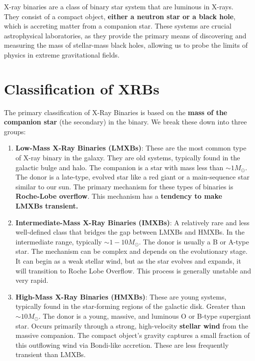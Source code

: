 X-ray binaries are a class of binary star system that are luminous in X-rays. 
They consist of a compact object, \textbf{either a neutron star or a black hole}, which is accreting matter from a companion star. These systems are crucial astrophysical laboratories, as they provide the primary means of discovering and measuring the mass of stellar-mass black holes, allowing us to probe the limits of physics in extreme gravitational fields.

\section{Classification of XRBs}

The primary classification of X-Ray Binaries is based on the \textbf{mass of the companion star} (the secondary) in the binary. We break these down into three groups:
\par
\vspace{10pt}
\begin{enumerate}
    \item \textbf{Low-Mass X-Ray Binaries (LMXBs)}: These are the most common type of X-ray binary in the galaxy. They are old systems, typically found in the galactic bulge and halo. The companion is a star with mass less than $\sim 1 M_{\odot}$. The donor is a late-type, evolved star like a red giant or a main-sequence star similar to our sun. The primary mechanism for these types of binaries is \textbf{Roche-Lobe overflow}. This mechanism has a \textbf{tendency to make LMXBs transient.}


    \item \textbf{Intermediate-Mass X-Ray Binaries (IMXBs)}: A relatively rare and less well-defined class that bridges the gap between LMXBs and HMXBs. In the intermediate range, typically $\sim 1-10 M_{\odot}$. The donor is usually a B or A-type star. The mechanism can be complex and depends on the evolutionary stage. It can begin as a weak stellar wind, but as the star evolves and expands, it will transition to Roche Lobe Overflow. This process is generally unstable and very rapid.

    \item \textbf{High-Mass X-Ray Binaries (HMXBs)}: These are young systems, typically found in the star-forming regions of the galactic disk. Greater than $\sim 10 M_{\odot}$. The donor is a young, massive, and luminous O or B-type supergiant star. Occurs primarily through a strong, high-velocity \textbf{stellar wind} from the massive companion. The compact object's gravity captures a small fraction of this outflowing wind via Bondi-like accretion. These are less frequently transient than LMXBs.
\end{enumerate}
\vspace{10pt}
